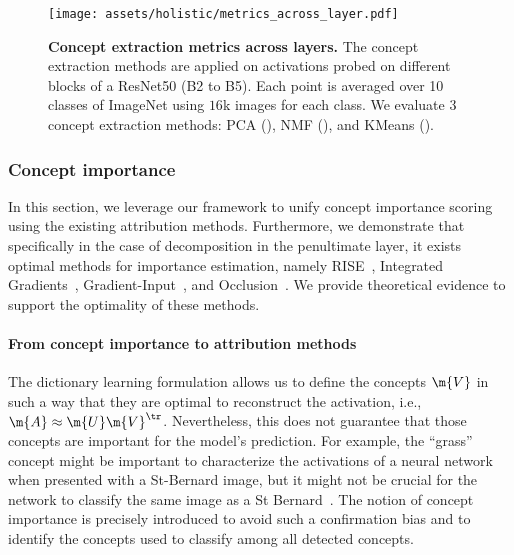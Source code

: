 \begin{figure}[ht]
\begin{center}
   \texttt{[image: assets/holistic/metrics\_across\_layer.pdf]}
\end{center}
   \caption{\textbf{Concept extraction metrics across layers.} The concept extraction methods are applied on activations probed on different blocks of a ResNet50 (B2 to B5). Each point is averaged over 10 classes of ImageNet using $16$k images for each class. We evaluate $3$ concept extraction methods: PCA (\dashed), NMF (\full), and KMeans (\dotted).
   }
\label{fig:holistic:metrics_across_layer}

\end{figure}
















\subsubsection{Concept importance}\label{sec:importance}


In this section, we leverage our framework to unify concept importance scoring using the existing attribution methods. Furthermore, we demonstrate that specifically in the case of decomposition in the penultimate layer, it exists optimal methods for importance estimation, namely RISE~\cite{petsiuk2018rise}, Integrated Gradients~\cite{sundararajan2017axiomatic}, Gradient-Input~\cite{shrikumar2017learning}, and Occlusion~\cite{zeiler2014visualizing}. We provide theoretical evidence to support the optimality of these methods.

\paragraph{From concept importance to attribution methods}
The dictionary learning formulation allows us to define the concepts $\m{V}$ in such a way that they are optimal to reconstruct the activation, i.e., $\m{A} \approx \m{U} \m{V}^\tr$. Nevertheless, this does not guarantee that those concepts are important for the model's prediction. For example, the ``grass'' concept might be important to characterize the activations of a neural network when presented with a 
St-Bernard image, but it might not be crucial for the network to classify the same image as a St Bernard~\cite{kim2018interpretability, adebayo2018sanity, ghorbani2017interpretation}. The notion of concept importance is precisely introduced to avoid such a confirmation bias and to identify the concepts used to classify among all detected concepts. 


